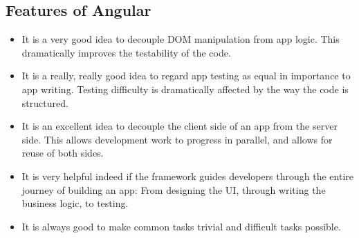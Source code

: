 \subsection{Features of Angular}
\begin{itemize}
\item It is a very good idea to decouple DOM manipulation from app logic. This dramatically improves the testability of the code.
\item It is a really, really good idea to regard app testing as equal in importance to app writing. Testing difficulty is dramatically affected by the way the code is structured.
\item It is an excellent idea to decouple the client side of an app from the server side. This allows development work to progress in parallel, and allows for reuse of both sides.
\item It is very helpful indeed if the framework guides developers through the entire journey of building an app: From designing the UI, through writing the business logic, to testing.
\item It is always good to make common tasks trivial and difficult tasks possible.
\end{itemize}
